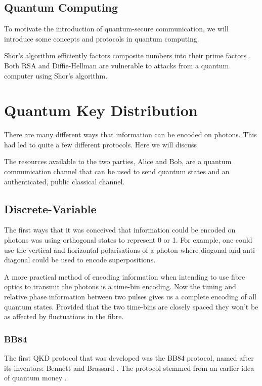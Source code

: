 \subsection{Quantum Computing}

To motivate the introduction of quantum-secure communication, we will introduce some concepts and protocols in quantum computing. 

Shor's algorithm efficiently factors composite numbers into their prime factors \cite{shor1994}. Both RSA and Diffie-Hellman are vulnerable to attacks from a quantum computer using Shor's algorithm.


\section{Quantum Key Distribution}

There are many different ways that information can be encoded on photons. This had led to quite a few different protocols. Here we will discuss 

The resources available to the two parties, Alice and Bob, are a quantum communication channel that can be used to send quantum states and an authenticated, public classical channel. 

\subsection{Discrete-Variable}

The first ways that it was conceived that information could be encoded on photons was using orthogonal states to represent 0 or 1. For example, one could use the vertical and horizontal polarisations of a photon where diagonal and anti-diagonal could be used to encode superpositions. 

A more practical method of encoding information when intending to use fibre optics to transmit the photons is a time-bin encoding. Now the timing and relative phase information between two pulses gives us a complete encoding of all quantum states. Provided that the two time-bins are closely spaced they won't be as affected by fluctuations in the fibre.

\subsubsection*{BB84}

The first \ac{QKD} protocol that was developed was the BB84 protocol, named after its inventors: Bennett and Brassard \cite{BB84}. The protocol stemmed from an earlier idea of quantum money \cite{quantum_money}.

